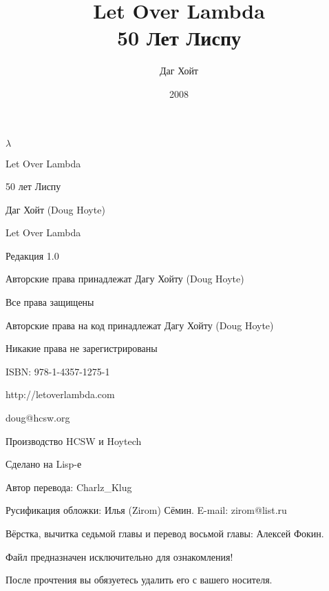 \documentclass[a4paper, 12pt]{book}
\title{Let Over Lambda \\50 Лет Лиспу}
\date{2008}
\author{Даг Хойт}
\begin{document}
\newcommand{\listbegin} {\vspace{0.1cm}\hrule}
\newcommand{\listend} {\hrule\vspace{0.1cm}}








\renewcommand {\contentsname} {Оглавление}
\renewcommand {\chaptername} {Глава}
%
\maketitle
\begin{center}
{\LARGE $\lambda$}


Let Over Lambda

50 лет Лиспу

Даг Хойт (Doug Hoyte)

Let Over Lambda

Редакция 1.0

Авторские права принадлежат Дагу Хойту (Doug Hoyte)

Все права защищены

Авторские права на код принадлежат Дагу Хойту (Doug Hoyte)

Никакие права не зарегистрированы

ISBN: 978-1-4357-1275-1

http://letoverlambda.com

doug@hcsw.org

Производство HCSW и Hoytech

Сделано на Lisp-е

Автор перевода: Charlz\_Klug

Русификация обложки: Илья (Zirom) Сёмин. E-mail: zirom@list.ru

Вёрстка, вычитка седьмой главы и перевод восьмой главы: Алексей Фокин.

{\color{red} Файл предназначен исключительно для ознакомления!

После прочтения вы обязуетесь удалить его с вашего носителя.}
\end{center}
\tableofcontents















\newpage 

\end{document}
